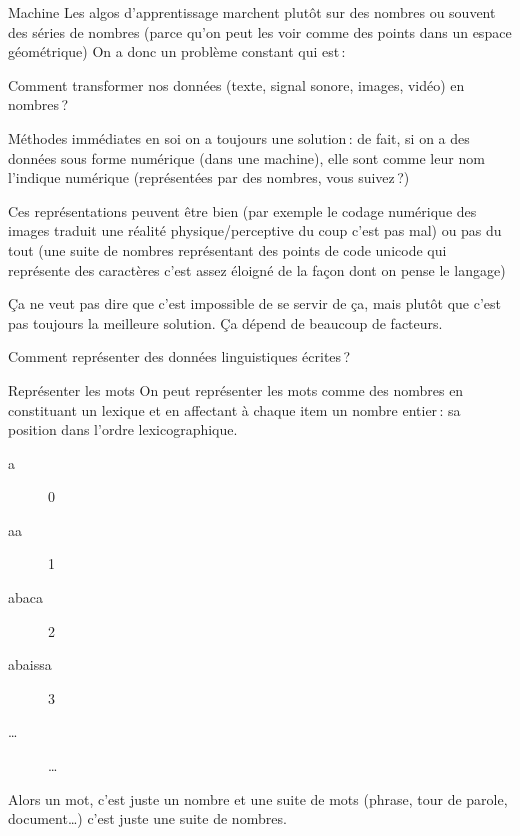 \documentclass[
	xcolor={svgnames},
	aspectratio=169,
	french,
]{beamer}
\begin{document}


\begin{frame}{Machine}
	Les algos d'apprentissage marchent plutôt sur des nombres ou souvent des séries de nombres (parce qu'on peut les voir comme des points dans un espace géométrique)  On a donc un problème constant qui est : 

	Comment transformer nos données (texte, signal sonore, images, vidéo) en nombres ?
\end{frame}

\begin{frame}{Méthodes immédiates}
	en soi on a toujours une solution : de fait, si on a des données sous forme numérique (dans une machine), elle sont comme leur nom l'indique numérique (représentées par des nombres, vous suivez ?)

	Ces représentations peuvent être bien (par exemple le codage numérique des images traduit une réalité physique/perceptive du coup c'est pas mal) ou pas du tout (une suite de nombres représentant des points de code unicode qui représente des caractères c'est assez éloigné de la façon dont on pense le langage)

	Ça ne veut pas dire que c'est impossible de se servir de ça, mais plutôt que c'est pas toujours la meilleure solution. Ça dépend de beaucoup de facteurs.
\end{frame}

\begin{frame}[standout]
	Comment représenter des données linguistiques écrites ?
\end{frame}

\begin{frame}{Représenter les mots}
	On peut représenter les mots comme des nombres en constituant un \alert{lexique} et en affectant à chaque item un nombre entier : sa position dans l'ordre lexicographique.

	\pause

	\begin{description}
		\item[a] \num{0}
		\item[aa] \num{1}
		\item[abaca] \num{2}
		\item[abaissa] \num{3}
		\item[…] … 
	\end{description}

	\pause

	Alors un mot, c'est juste un nombre et une suite de mots (phrase, tour de parole, document…) c'est juste une suite de nombres.
\end{frame}
\end{document}
